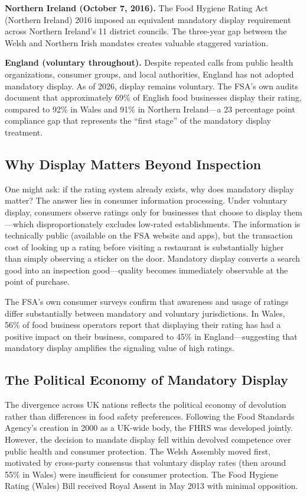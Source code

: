 \documentclass[12pt]{article}
\begin{document}
\textbf{Northern Ireland (October 7, 2016).} The Food Hygiene Rating Act (Northern Ireland) 2016 imposed an equivalent mandatory display requirement across Northern Ireland's 11 district councils. The three-year gap between the Welsh and Northern Irish mandates creates valuable staggered variation.

\textbf{England (voluntary throughout).} Despite repeated calls from public health organizations, consumer groups, and local authorities, England has not adopted mandatory display. As of 2026, display remains voluntary. The FSA's own audits document that approximately 69\% of English food businesses display their rating, compared to 92\% in Wales and 91\% in Northern Ireland---a 23 percentage point compliance gap that represents the ``first stage'' of the mandatory display treatment.

\subsection{Why Display Matters Beyond Inspection}

One might ask: if the rating system already exists, why does mandatory display matter? The answer lies in consumer information processing. Under voluntary display, consumers observe ratings only for businesses that choose to display them---which disproportionately excludes low-rated establishments. The information is technically public (available on the FSA website and apps), but the transaction cost of looking up a rating before visiting a restaurant is substantially higher than simply observing a sticker on the door. Mandatory display converts a search good into an inspection good---quality becomes immediately observable at the point of purchase.

The FSA's own consumer surveys confirm that awareness and usage of ratings differ substantially between mandatory and voluntary jurisdictions. In Wales, 56\% of food business operators report that displaying their rating has had a positive impact on their business, compared to 45\% in England---suggesting that mandatory display amplifies the signaling value of high ratings.

\subsection{The Political Economy of Mandatory Display}

The divergence across UK nations reflects the political economy of devolution rather than differences in food safety preferences. Following the Food Standards Agency's creation in 2000 as a UK-wide body, the FHRS was developed jointly. However, the decision to mandate display fell within devolved competence over public health and consumer protection. The Welsh Assembly moved first, motivated by cross-party consensus that voluntary display rates (then around 55\% in Wales) were insufficient for consumer protection. The Food Hygiene Rating (Wales) Bill received Royal Assent in May 2013 with minimal opposition.
\end{document}
